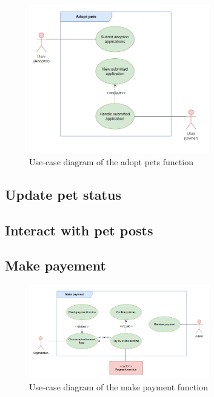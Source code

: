 \begin {figure}[H]
\centering
\includegraphics[width=0.7\textwidth]{Figures/adopt_pet_ucd.png}
\caption{Use-case diagram of the adopt pets function}
\label{fig:adopt-pet-activity-diagram}
\end{figure}



\subsection{Update pet status}



\subsection{Interact with pet posts}


\subsection{Make payement}

\begin {figure}[H]
\centering
\includegraphics[width=0.7\textwidth]{Figures/payment_ucd.png}
\caption{Use-case diagram of the make payment function}
\label{fig:payment-activity-diagram}
\end{figure}



